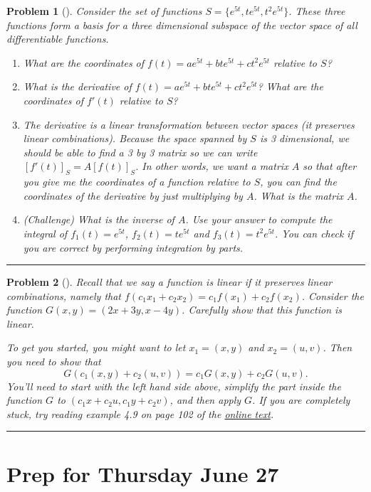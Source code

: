 \documentclass[letterpaper,oneside]{book}%
\newcommand{\onlinetext}{https://content.byui.edu/file/c2f91762-7a1e-4d0b-a1ae-8d5f5f548e17/1/341-Book.pdf}
\theoremstyle{plain}
\theoremstyle{box}
\theoremstyle{problem}
\newtheorem{problemnum}{Problem}[chapter]
\newenvironment{problem}[1][]{\begin{problemnum}[#1]}{\end{problemnum}\nopagebreak\hrule\bigskip}
\begin{document}
\begin{problem}
Consider the set of functions $S=\{e^{5t}, te^{5t}, t^2e^{5t}\}$.  These three functions form a basis for a three dimensional subspace of the vector space of all differentiable functions.
\begin{enumerate}
 \item What are the coordinates of $f(t) = ae^{5t}+bte^{5t}+ct^2e^{5t}$ relative to $S$?
 \item What is the derivative of $f(t) = ae^{5t}+bte^{5t}+ct^2e^{5t}$?  What are the coordinates of $f'(t)$ relative to $S$?
 \item The derivative is a linear transformation between vector spaces (it preserves linear combinations).  Because the space spanned by $S$ is 3 dimensional, we should be able to find a 3 by 3 matrix so we can write $[f'(t)]_S = A[f(t)]_S$.  In other words, we want a matrix $A$ so that after you give me the coordinates of a function relative to $S$, you can find the coordinates of the derivative by just multiplying by $A$.  What is the matrix $A$.
 \item (Challenge) What is the inverse of $A$.  Use your answer to compute the integral of $f_1(t)=e^{5t}$, $f_2(t)=te^{5t}$ and $f_3(t)=t^2e^{5t}$. You can check if you are correct by performing integration by parts. 
\end{enumerate}
\end{problem}





\begin{problem}
 Recall that we say a function is linear if it preserves linear combinations, namely that $f(c_1x_1+c_2x_2) = c_1f(x_1)+c_2f(x_2)$.  Consider the function $G(x,y) = (2x+3y,x-4y)$.  Carefully show that this function is linear.  
 
 To get you started, you might want to let $x_1 = (x,y)$ and $x_2=(u,v)$. Then you need to show that
 $$G(c_1(x,y)+c_2(u,v)) = c_1G(x,y)+c_2G(u,v).$$
 You'll need to start with the left hand side above, simplify the part inside the function $G$ to $(c_1x+c_2u,c_1y+c_2v)$, and then apply $G$. If you are completely stuck, try reading example 4.9 on page 102 of the \href{\onlinetext}{online text}.
\end{problem}





\section{Prep for Thursday June 27}
\end{document}

